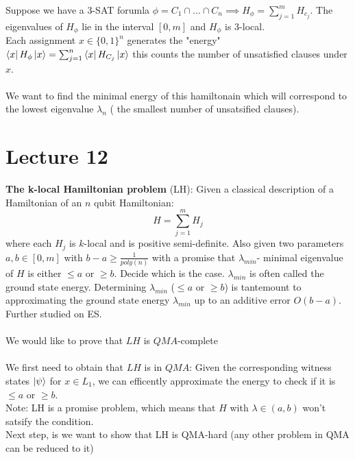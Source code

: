 \documentclass{article}
\begin{document}
               Suppose we have a 3-SAT forumla $\phi = C_1 \cap ... \cap C_n \implies H_{\phi} = \sum_{j=1}^m H_{c_j}$. The eigenvalues of $H_{\phi}$ lie in the interval $[0,m]$ and $H_{\phi}$ is 3-local.\\
                       Each assignment $x \in \{0,1\}^n$ generates the "energy"\\
                       $\bra{x} H_{\phi} \ket{x} = \sum_{j=1}^n \bra{x} H_{C_j} \ket{x}$ this counts the number of unsatisfied clauses under $x$.\\\\
                       We want to find the minimal energy of this hamiltonain which will correspond to the lowest eigenvalue $\lambda_n$ ( the smallest number of unsatsified clauses).
                       \section{Lecture 12}
                       \textbf{The k-local Hamiltonian problem} (LH): Given a classical description of a Hamiltonian of an $n$ qubit Hamiltonian:
                       $$
                       H = \sum_{j=1}^m H_j
                       $$
                       where each $H_j$ is $k$-local and is positive semi-definite. Also given two parameters $a,b \in [0,m]$ with $b-a \geq \frac{1}{poly(n)}$ with a promise that $\lambda_{min}$- minimal eigenvalue of $H$ is either $\leq a$ or $\geq b$. Decide which is the case.
                       $\lambda_{min}$ is often called the ground state energy. Determining $\lambda_{min}$ ($\leq a$ or $\geq b$) is tantemount to approximating the ground state energy $\lambda_{min}$ up to an additive error $O(b-a)$. Further studied on ES.\\\\
                       We would like to prove that $LH$ is $QMA$-complete\\\\
                       We first need to obtain that $LH$ is in $QMA$: Given the corresponding witness states $\ket{\psi}$ for $x \in L_1$, we can efficently approximate the energy to check if it is $\leq a$ or $\geq b$.\\
                       Note: LH is a promise problem, which means that $H$ with $\lambda \in (a,b)$ won't satsify the condition.\\
                       Next step, is we want to show that LH is QMA-hard (any other problem in QMA can be reduced to it)\\\\
\end{document}
